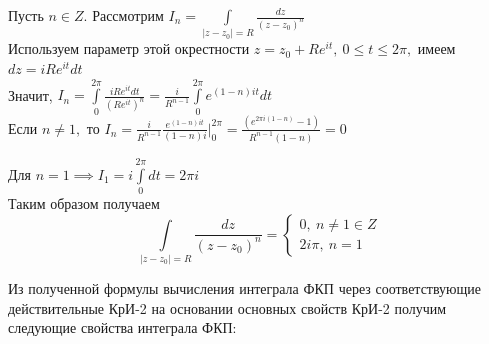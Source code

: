 \documentclass[../../main.tex]{subfiles}
\begin{document}
\begin{example}
    Пусть $n \in Z.$ Рассмотрим 
    $I_n = \int\limits_{|z-z_0| = R}{\frac{dz}{\left(z-z_0\right)^n}}$\\
    Используем параметр этой окрестности $z=z_0 + Re^{it}, \
    0 \leq t \leq 2\pi,$ имеем
    $dz = iRe^{it}dt$\\
    Значит, $I_n = \int\limits_0^{2\pi}{\frac{iRe^{it}dt}{
    (Re^{it})^n}} = \frac{i}{R^{n-1}}\int\limits_0^{2\pi}{
    e^{(1-n)it}dt}$\\
    Если $n \neq 1, $ то $I_n = \frac{i}{R^{n-1}}\frac{
    e^{(1-n)it}}{(1-n)i}\bigg|_0^{2\pi} = \frac{
    (e^{2\pi i(1-n)}-1)}{R^{n-1}(1-n)} = 0$
    
    Для $n=1 \implies I_1 = i\int\limits_0^{2\pi}{dt} = 2\pi i$\\
    Таким образом получаем 
    \begin{equation}
        \label{lec30_2:6}
        \int\limits_{|z-z_0| = R}{\frac{dz}{(z-z_0)^n}} = 
        \begin{cases}
            0,\ n \neq 1 \in Z\\
            2i\pi,\ n = 1
        \end{cases}
    \end{equation}
\end{example}

Из полученной формулы вычисления интеграла ФКП через соответствующие
действительные КрИ-2 на основании основных свойств КрИ-2 получим 
следующие свойства интеграла ФКП:
\end{document}
